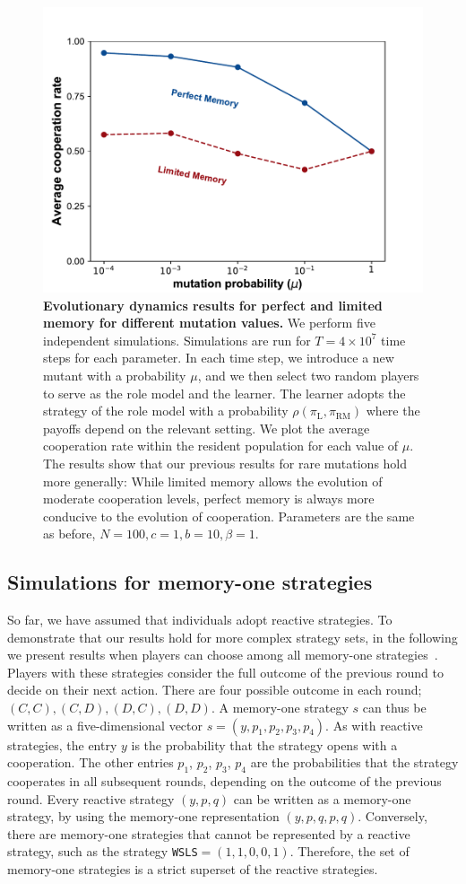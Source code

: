 \documentclass[11pt]{article}
\def\rolemodel{\text{RM}}
\def\learner{\text{L}}
\def\strategy{s}
\theoremstyle{plainCl1}
\theoremstyle{plainCl2}
\begin{document}
\begin{figure}[!htbp]
	\centering 
	\includegraphics[width=.5\textwidth]{static/mutation_perfect_and_limited_memory_donation_game.pdf}
	\caption{\textbf{Evolutionary dynamics results for perfect and limited memory
			for different mutation values.}
		We perform five independent simulations. Simulations are run
		for $T\!=\!4\times 10^7$ time steps for each parameter. In each time step,
		we introduce a new mutant with a probability \(\mu\), and we then select
		two random players to serve as the role model and the learner. The learner
		adopts the strategy of the role model with a probability \(\rho(\pi_\learner, \pi_\rolemodel)\) where the
		payoffs depend on the relevant setting. We plot the average cooperation rate
		within the resident population for each value of \(\mu\). 
		The results show that our previous results for rare mutations hold more generally:
		While limited memory allows the evolution of moderate cooperation levels, perfect memory is always more conducive to the evolution of cooperation. 
		Parameters are the same as before, \(N =100, c=1, b=10, \beta=1\).}\label{fig:mutation}
\end{figure}

\subsection{Simulations for memory-one strategies}\label{section:memory_one}

So far, we have assumed that individuals adopt reactive strategies.
To demonstrate that our results hold for more complex strategy sets, 
in the following we present results when players can choose among all memory-one strategies~\citep{sigmund2010calculus}. 
Players with these strategies consider the full outcome of the
previous round to decide on their next action. 
There are four possible outcome in each
round; \((C, C), (C, D), (D, C), (D, D)\). 
A memory-one strategy \(\strategy\) can thus be
written as a five-dimensional vector \(\strategy=(y, p_1, p_2, p_3, p_4)\). 
As with reactive strategies, the entry \(y\) is the probability that the strategy opens with a cooperation.
The other entries \(p_1\), \(p_2\), \(p_3\), \(p_4\) are the probabilities that the strategy
cooperates in all subsequent rounds, depending on the outcome of the previous round.
Every reactive strategy $(y,p,q)$ can be written as a memory-one strategy, by using the memory-one representation $(y,p,q,p,q)$.
Conversely, there are memory-one strategies that cannot be represented by a reactive strategy, such as the strategy \texttt{WSLS}$=(1,1,0,0,1)$. 
Therefore, the set of memory-one strategies is a strict superset of the reactive strategies. 
\end{document}
